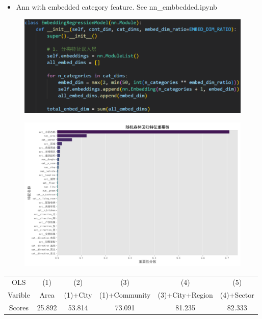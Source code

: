 \documentclass{beamer}
\begin{document}
\begin{frame}
\begin{figure}
    \end{figure}
    \begin{itemize}
        \item {\footnotesize Ann with embedded category feature. See nn\_embbedded.ipynb}
    \end{itemize}
\begin{figure}
    \includegraphics[width=0.8\linewidth]{figure/embed.jpg}
\end{figure}
\end{frame}

\begin{frame}
\begin{figure}
    \includegraphics[width=\linewidth]{figure/rf_feature_importance.png}
\end{figure}
\begin{scriptsize}
    \begin{table}
    \center
    \begin{tabular}{cccccc}
        \toprule
        \toprule
        OLS &(1)&(2)&(3)&(4)&(5)\\
        Varible & Area  & (1)+City & (1)+Community & (3)+City+Region & (4)+Sector\\
        \midrule
        Scores & 25.892 & 53.814 & 73.091 & 81.235 & 82.333\\
    \end{tabular}
\end{table}
\end{scriptsize}
\end{frame}
\end{document}
